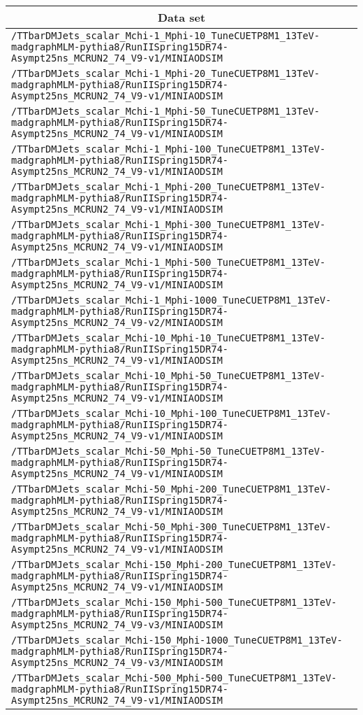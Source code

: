 \begin{center}
\begin{tabular}{l}
\hline\hline
\multicolumn{1}{c}{Data set}\tabularnewline
\hline
\verb!/TTbarDMJets_scalar_Mchi-1_Mphi-10_TuneCUETP8M1_13TeV-madgraphMLM-pythia8/RunIISpring15DR74-Asympt25ns_MCRUN2_74_V9-v1/MINIAODSIM! \tabularnewline
\verb!/TTbarDMJets_scalar_Mchi-1_Mphi-20_TuneCUETP8M1_13TeV-madgraphMLM-pythia8/RunIISpring15DR74-Asympt25ns_MCRUN2_74_V9-v1/MINIAODSIM! \tabularnewline
\verb!/TTbarDMJets_scalar_Mchi-1_Mphi-50_TuneCUETP8M1_13TeV-madgraphMLM-pythia8/RunIISpring15DR74-Asympt25ns_MCRUN2_74_V9-v1/MINIAODSIM! \tabularnewline
\verb!/TTbarDMJets_scalar_Mchi-1_Mphi-100_TuneCUETP8M1_13TeV-madgraphMLM-pythia8/RunIISpring15DR74-Asympt25ns_MCRUN2_74_V9-v1/MINIAODSIM! \tabularnewline
\verb!/TTbarDMJets_scalar_Mchi-1_Mphi-200_TuneCUETP8M1_13TeV-madgraphMLM-pythia8/RunIISpring15DR74-Asympt25ns_MCRUN2_74_V9-v1/MINIAODSIM! \tabularnewline
\verb!/TTbarDMJets_scalar_Mchi-1_Mphi-300_TuneCUETP8M1_13TeV-madgraphMLM-pythia8/RunIISpring15DR74-Asympt25ns_MCRUN2_74_V9-v1/MINIAODSIM! \tabularnewline
\verb!/TTbarDMJets_scalar_Mchi-1_Mphi-500_TuneCUETP8M1_13TeV-madgraphMLM-pythia8/RunIISpring15DR74-Asympt25ns_MCRUN2_74_V9-v1/MINIAODSIM! \tabularnewline
\verb!/TTbarDMJets_scalar_Mchi-1_Mphi-1000_TuneCUETP8M1_13TeV-madgraphMLM-pythia8/RunIISpring15DR74-Asympt25ns_MCRUN2_74_V9-v2/MINIAODSIM! \tabularnewline
\verb!/TTbarDMJets_scalar_Mchi-10_Mphi-10_TuneCUETP8M1_13TeV-madgraphMLM-pythia8/RunIISpring15DR74-Asympt25ns_MCRUN2_74_V9-v1/MINIAODSIM! \tabularnewline
\verb!/TTbarDMJets_scalar_Mchi-10_Mphi-50_TuneCUETP8M1_13TeV-madgraphMLM-pythia8/RunIISpring15DR74-Asympt25ns_MCRUN2_74_V9-v1/MINIAODSIM! \tabularnewline
\verb!/TTbarDMJets_scalar_Mchi-10_Mphi-100_TuneCUETP8M1_13TeV-madgraphMLM-pythia8/RunIISpring15DR74-Asympt25ns_MCRUN2_74_V9-v1/MINIAODSIM! \tabularnewline
\verb!/TTbarDMJets_scalar_Mchi-50_Mphi-50_TuneCUETP8M1_13TeV-madgraphMLM-pythia8/RunIISpring15DR74-Asympt25ns_MCRUN2_74_V9-v1/MINIAODSIM! \tabularnewline
\verb!/TTbarDMJets_scalar_Mchi-50_Mphi-200_TuneCUETP8M1_13TeV-madgraphMLM-pythia8/RunIISpring15DR74-Asympt25ns_MCRUN2_74_V9-v1/MINIAODSIM! \tabularnewline
\verb!/TTbarDMJets_scalar_Mchi-50_Mphi-300_TuneCUETP8M1_13TeV-madgraphMLM-pythia8/RunIISpring15DR74-Asympt25ns_MCRUN2_74_V9-v1/MINIAODSIM! \tabularnewline
\verb!/TTbarDMJets_scalar_Mchi-150_Mphi-200_TuneCUETP8M1_13TeV-madgraphMLM-pythia8/RunIISpring15DR74-Asympt25ns_MCRUN2_74_V9-v1/MINIAODSIM! \tabularnewline
\verb!/TTbarDMJets_scalar_Mchi-150_Mphi-500_TuneCUETP8M1_13TeV-madgraphMLM-pythia8/RunIISpring15DR74-Asympt25ns_MCRUN2_74_V9-v3/MINIAODSIM! \tabularnewline
\verb!/TTbarDMJets_scalar_Mchi-150_Mphi-1000_TuneCUETP8M1_13TeV-madgraphMLM-pythia8/RunIISpring15DR74-Asympt25ns_MCRUN2_74_V9-v3/MINIAODSIM! \tabularnewline
\verb!/TTbarDMJets_scalar_Mchi-500_Mphi-500_TuneCUETP8M1_13TeV-madgraphMLM-pythia8/RunIISpring15DR74-Asympt25ns_MCRUN2_74_V9-v1/MINIAODSIM! \tabularnewline
\hline
\end{tabular}\end{center}
